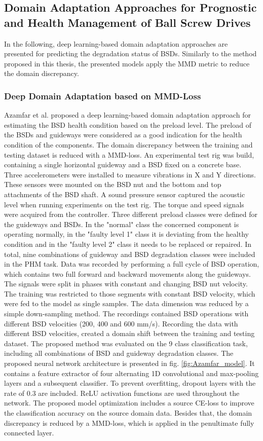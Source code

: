 \subsection{Domain Adaptation Approaches for Prognostic and Health Management of Ball Screw Drives}
In the following, deep learning-based domain adaptation approaches are presented for predicting the degradation status of BSDs. Similarly to the method proposed in this thesis, the presented models apply the MMD metric to reduce the domain discrepancy.


\subsubsection{Deep Domain Adaptation based on MMD-Loss}
Azamfar et al. \cite{AZAMFAR2020103932} proposed a deep learning-based domain adaptation approach for estimating the BSD health condition based on the preload level. The preload of the BSDs and guideways were considered as a good indication for the health condition of the components. The domain discrepancy between the training and testing dataset is reduced with a MMD-loss. An experimental test rig was build, containing a single horizontal guideway and a BSD fixed on a concrete base. Three accelerometers were installed to measure vibrations in X and Y directions. These sensors were mounted on the BSD nut and the bottom and top attachments of the BSD shaft. A sound pressure sensor captured the acoustic level when running experiments on the test rig. The torque and speed signals were acquired from the controller. Three different preload classes were defined for the guideways and BSDs. In the "normal" class the concerned component is operating normally, in the "faulty level 1" class it is deviating from the healthy condition and in the "faulty level 2" class it needs to be replaced or repaired. In total, nine combinations of guideway and BSD degradation classes were included in the PHM task. Data was recorded by performing a full cycle of BSD operation, which contains two full forward and backward movements along the guideways. The signals were split in phases with constant and changing BSD nut velocity. The training was restricted to those segments with constant BSD velocity, which were fed to the model as single samples. The data dimension was reduced by a simple down-sampling method. The recordings contained BSD operations with different BSD velocities (200, 400 and 600 mm/s). Recording the data with different BSD velocities, created a domain shift between the training and testing dataset. The proposed method was evaluated on the 9 class classification task, including all combinations of BSD and guideway degradation classes. The proposed neural network architecture is presented in fig. \ref{fig:Azamfar_model}. It contains a feature extractor of four alternating 1D convolutional and max-pooling layers and a subsequent classifier. To prevent overfitting, dropout layers with the rate of 0.3 are included. ReLU activation functions are used throughout the network. The proposed model optimization includes a source CE-loss to improve the classification accuracy on the source domain data. Besides that, the domain discrepancy is reduced by a MMD-loss, which is applied in the penultimate fully connected layer. 


